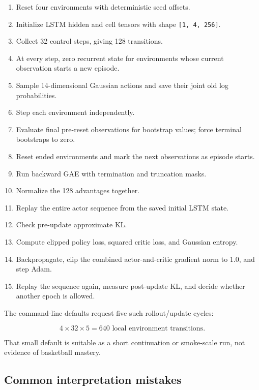 \documentclass[
  american,
  11pt,
  letterpaper,
]{article}
\providecommand{\tightlist}{%
  \setlength{\itemsep}{0pt}\setlength{\parskip}{0pt}}
\begin{document}
\begin{enumerate}
\def\labelenumi{\arabic{enumi}.}
\tightlist
\item
  Reset four environments with deterministic seed offsets.
\item
  Initialize LSTM hidden and cell tensors with shape
  \texttt{{[}1,\ 4,\ 256{]}}.
\item
  Collect 32 control steps, giving 128 transitions.
\item
  At every step, zero recurrent state for environments whose current
  observation starts a new episode.
\item
  Sample 14-dimensional Gaussian actions and save their joint old log
  probabilities.
\item
  Step each environment independently.
\item
  Evaluate final pre-reset observations for bootstrap values; force
  terminal bootstraps to zero.
\item
  Reset ended environments and mark the next observations as episode
  starts.
\item
  Run backward GAE with termination and truncation masks.
\item
  Normalize the 128 advantages together.
\item
  Replay the entire actor sequence from the saved initial LSTM state.
\item
  Check pre-update approximate KL.
\item
  Compute clipped policy loss, squared critic loss, and Gaussian
  entropy.
\item
  Backpropagate, clip the combined actor-and-critic gradient norm to
  1.0, and step Adam.
\item
  Replay the sequence again, measure post-update KL, and decide whether
  another epoch is allowed.
\end{enumerate}

The command-line defaults request five such rollout/update cycles:

\[
4\times32\times5=640
\text{ local environment transitions}.
\]

That small default is suitable as a short continuation or smoke-scale
run, not evidence of basketball mastery.

\subsection{Common interpretation
mistakes}\label{common-interpretation-mistakes}
\end{document}
